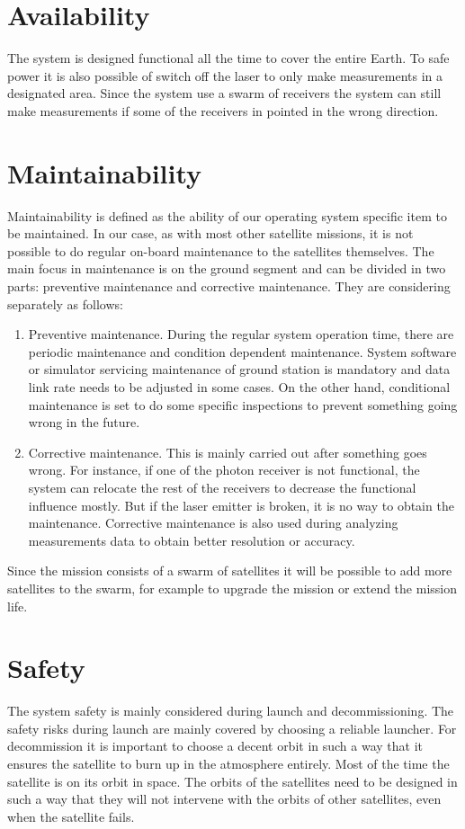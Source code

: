 \section{Availability}
\label{blRAMSavail}
The system is designed functional all the time to cover the entire Earth. To safe power it is also possible of switch off the laser to only make measurements in a designated area. Since the system use a swarm of receivers the system can still make measurements if some of the receivers in pointed in the wrong direction.

\section{Maintainability}
\label{blRAMSmaint}
Maintainability is defined as the ability of our operating system specific item to be maintained. In our case, as with most other satellite missions, it is not possible to do regular on-board maintenance to the satellites themselves. The main focus in maintenance is on the ground segment and can be divided in two parts: preventive maintenance and corrective maintenance. They are considering separately as follows: 
	\begin{enumerate}
		\item Preventive maintenance. During the regular system operation time, there are periodic maintenance and condition dependent maintenance.  System software or simulator servicing maintenance of ground station is mandatory and data link rate needs to be adjusted in some cases. On the other hand, conditional maintenance is set to do some specific inspections to prevent something going wrong in the future.
		\item Corrective maintenance. This is mainly carried out after something goes wrong. For instance, if one of the photon receiver is not functional, the system can relocate the rest of the receivers to decrease the functional influence mostly. But if the laser emitter is broken, it is no way to obtain the maintenance. Corrective maintenance is also used during analyzing measurements data to obtain better resolution or accuracy.
  	\end{enumerate}
Since the mission consists of a swarm of satellites it will be possible to add more satellites to the swarm, for example to upgrade the mission or extend the mission life. 

\section{Safety}
\label{blRAMSsaf} 
The system safety is mainly considered during launch and decommissioning. The safety risks during launch are mainly covered by choosing a reliable launcher. For decommission it is important to choose a decent orbit in such a way that it ensures the satellite to burn up in the atmosphere entirely. Most of the time the satellite is on its orbit in space. The orbits of the satellites need to be designed in such a way that they will not intervene with the orbits of other satellites, even when the satellite fails. 